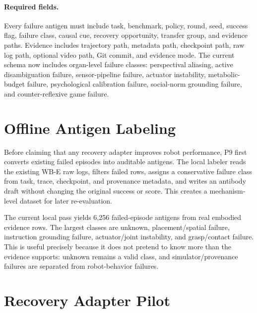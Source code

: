 \documentclass[11pt]{article}
\begin{document}
\paragraph{Required fields.}
Every failure antigen must include task, benchmark, policy, round, seed, success flag, failure class, causal cue, recovery opportunity, transfer group, and evidence paths.
Evidence includes trajectory path, metadata path, checkpoint path, raw log path, optional video path, Git commit, and evidence mode.
The current schema now includes organ-level failure classes: perspectival aliasing, active disambiguation failure, sensor-pipeline failure, actuator instability, metabolic-budget failure, psychological calibration failure, social-norm grounding failure, and counter-reflexive game failure.

\section{Offline Antigen Labeling}

Before claiming that any recovery adapter improves robot performance, P9 first converts existing failed episodes into auditable antigens.
The local labeler reads the existing WB-E raw logs, filters failed rows, assigns a conservative failure class from task, trace, checkpoint, and provenance metadata, and writes an antibody draft without changing the original success or score.
This creates a mechanism-level dataset for later re-evaluation.

\begin{table}[t]
\centering
\scriptsize
\caption{Offline antigen summary over existing failed WB-E rows. The table is generated from \texttt{embodied\_antigen\_summary\_v0.json}; it is an annotation artifact, not a new performance result.}
\label{tab:antigen_summary}

\end{table}

The current local pass yields 6,256 failed-episode antigens from real embodied evidence rows.
The largest classes are unknown, placement/spatial failure, instruction grounding failure, actuator/joint instability, and grasp/contact failure.
This is useful precisely because it does not pretend to know more than the evidence supports: unknown remains a valid class, and simulator/provenance failures are separated from robot-behavior failures.

\section{Recovery Adapter Pilot}
\end{document}

